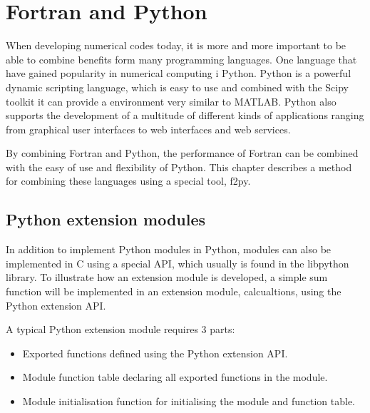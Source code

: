 \chapter{Fortran and Python}

When developing numerical codes today, it is more and more important to be able to combine benefits form many programming languages. One language that have gained popularity in numerical computing i Python. Python is a powerful dynamic scripting language, which is easy to use and combined with the Scipy toolkit it can provide a environment very similar to MATLAB. Python also supports the development of a multitude of different kinds of applications ranging from graphical user interfaces to web interfaces and web services. 

By combining Fortran and Python, the performance of Fortran can be combined with the easy of use and flexibility of Python. This chapter describes a method for combining these languages using a special tool, f2py.

\section{Python extension modules}

In addition to implement Python modules in Python, modules can also be implemented in C using a special API, which usually is found in the libpython library. To illustrate how an extension module is developed, a simple sum function will be implemented in an extension module, calcualtions, using the Python extension API.

A typical Python extension module requires 3 parts:

\begin{itemize}
\item Exported functions defined using the Python extension API.
\item Module function table declaring all exported functions in the module.
\item Module initialisation function for initialising the module and function table.
\end{itemize}

